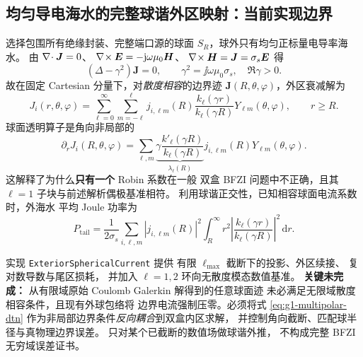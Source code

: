 \subsection{均匀导电海水的完整球谐外区映射：当前实现边界}
选择包围所有绝缘封装、完整端口源的球面
\(S_R\)，球外只有均匀正标量电导率海水。
由 \(\nabla\!\cdot\bm J=0\)、
\(\nabla\!\times\bm E=-\mathrm j\omega\mu_0\bm H\)、
\(\nabla\!\times\bm H=\bm J=\sigma_s\bm E\) 得
\[
(\Delta-\gamma^2)\bm J=0,\qquad
\gamma^2=\jj\omega\mu_0\sigma_s,\quad\Re\gamma>0.
\]
故在固定 Cartesian 分量下，对\emph{散度相容}的边界迹
\(\bm J(R,\theta,\varphi)\)，外区衰减解为
\begin{equation}
J_i(r,\theta,\varphi)
=\sum_{\ell=0}^{\infty}\sum_{m=-\ell}^{\ell}
j_{i,\ell m}(R)
\frac{k_\ell(\gamma r)}{k_\ell(\gamma R)}
Y_{\ell m}(\theta,\varphi),\qquad r\ge R.
\end{equation}
球面透明算子是角向非局部的
\begin{equation}
\partial_r J_i(R,\theta,\varphi)
=\sum_{\ell,m}
\underbrace{\gamma\frac{k'_\ell(\gamma R)}
{k_\ell(\gamma R)}}_{\lambda_\ell(R)}
j_{i,\ell m}(R)Y_{\ell m}(\theta,\varphi).
\label{eq:g1-multipolar-dtn}
\end{equation}
这解释了为什么\textbf{只有一个} Robin 系数在一般
双盒 BFZI 问题中不正确，且其 \(\ell=1\)
子块与前述解析偶极基准相符。
利用球谐正交性，已知相容球面电流系数时，外海水
平均 Joule 功率为
\[
P_{\mathrm{tail}}
=\frac1{2\sigma_s}\sum_{i,\ell,m}
|j_{i,\ell m}(R)|^2
\int_R^\infty r^2\left|
\frac{k_\ell(\gamma r)}{k_\ell(\gamma R)}
\right|^2\,\mathrm dr .
\]

实现 \texttt{ExteriorSphericalCurrent} 提供
有限 \(\ell_{\max}\) 截断下的投影、外区续接、
复对数导数与尾区损耗，
并加入 \(\ell=1,2\) 环向无散度模态数值基准。
\textbf{关键未完成：}
从有限域原始 Coulomb Galerkin 解得到的任意球面迹
未必满足无限域散度相容条件，且现有外球包络将
边界电流强制压零。必须将式
\eqref{eq:g1-multipolar-dtn}
作为非局部边界条件\emph{反向耦合}到双盒内区求解，
并控制角向截断、匹配球半径与真物理边界误差。
只对某个已截断的数值场做球谐外推，
不构成完整 BFZI 无穷域误差证书。

